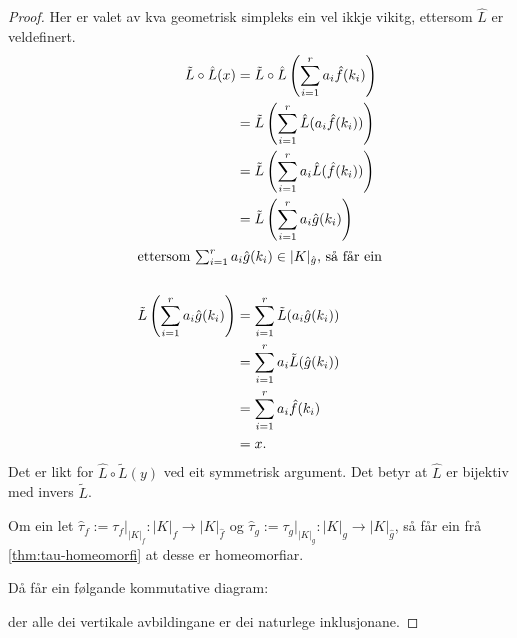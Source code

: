 \documentclass[a4paper, 12pt, norsk]{article}
\theoremstyle{plain}
\theoremstyle{definition}
\newcommand{\Rb}{\mathbb{R}}
\newcommand{\gr}[1]{ \lvert #1 \rvert } %
\begin{document}
\begin{proof}
	Her er valet av kva geometrisk simpleks ein vel ikkje vikitg, ettersom $\hat{L}$ er veldefinert.
	\begin{align*}
		\tilde{L}\circ \hat{L}(x) &= \tilde{L}\circ \hat{L}\left(\sum_{i=1}^ra_i\hat{f}(k_i)\right) \\
		&= \tilde{L}\left(\sum_{i=1}^r\hat{L}(a_i\hat{f}(k_i))\right) \\
		&= \tilde{L}\left(\sum_{i=1}^ra_i\hat{L}(\hat{f}(k_i))\right) \\
		&= \tilde{L}\left(\sum_{i=1}^ra_i\hat{g}(k_i)\right) \\
		\intertext{ettersom $\sum_{i=1}^ra_i\hat{g}(k_i)\in\gr{K}_{\hat{g}}$, så får ein} \\
		\tilde{L}\left(\sum_{i=1}^ra_i\hat{g}(k_i)\right) &= \sum_{i=1}^r\tilde{L}(a_i\hat{g}(k_i)) \\
		&= \sum_{i=1}^ra_i\tilde{L}(\hat{g}(k_i)) \\
		&= \sum_{i=1}^ra_i\hat{f}(k_i) \\
		&= x.
	\end{align*}
	Det er likt for $\hat{L}\circ\tilde{L}(y)$ ved eit symmetrisk argument. Det betyr at $\hat{L}$ er bijektiv med invers $\tilde{L}$.
	
	Om ein let $\hat{\tau}_f:=\tau_f|_{\gr{K}_f} : \gr{K}_f \to \gr{K}_{\hat{f}}$ og $\hat{\tau}_g:=\tau_g|_{\gr{K}_g} : \gr{K}_g \to \gr{K}_{\hat{g}}$, så får ein frå \autoref{thm:tau-homeomorfi} at desse er homeomorfiar.
	
	Då får ein følgande kommutative diagram:
	\begin{center} %
	\end{center}
	der alle dei vertikale avbildingane er dei naturlege inklusjonane.


\end{proof}
\end{document}
